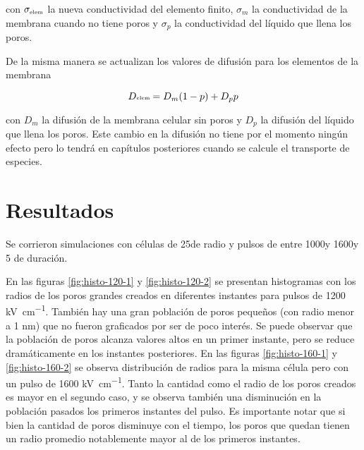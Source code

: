 con $\sigma_{\textrm{\tiny elem}}$ la nueva conductividad del elemento finito, $\sigma_m$ la conductividad de la membrana cuando no tiene poros y $\sigma_p$ la conductividad del líquido que llena los poros.

De la misma manera se actualizan los valores de difusión para los elementos de la membrana 

\begin{equation} 
	D{\textrm{\tiny elem}} = D_m (1 - p) + D_p p
\end{equation} 

con $D_m$ la difusión de la membrana celular sin poros y $D_p$ la difusión del líquido que llena los poros. Este cambio en la difusión no tiene por el momento ningún efecto pero lo tendrá en capítulos posteriores cuando se calcule el transporte de especies.

\section{Resultados}

Se corrieron simulaciones con células de 25\um de radio y pulsos de entre 1000\kvcm y 1600\kvcm y 5 \ms de duración. 

%



En las figuras \ref{fig:histo-120-1} y \ref{fig:histo-120-2} se presentan histogramas con los radios de los poros grandes creados en diferentes instantes para pulsos de 1200 \si{\kilo\volt\per\centi\metre}. También hay una gran población de poros pequeños (con radio menor a 1 \si{\nano\metre}) que no fueron graficados por ser de poco interés. Se puede observar que la población de poros alcanza valores altos en un primer instante, pero se reduce dramáticamente en los instantes posteriores. En las figuras \ref{fig:histo-160-1} y \ref{fig:histo-160-2} se observa distribución de radios para la misma célula pero con un pulso de 1600 \si{\kilo\volt\per\centi\metre}. Tanto la cantidad como el radio de los poros creados es mayor en el segundo caso, y se observa también una disminución en la población pasados los primeros instantes del pulso. Es importante notar que si bien la cantidad de poros disminuye con el tiempo, los poros que quedan tienen un radio promedio notablemente mayor al de los primeros instantes.

